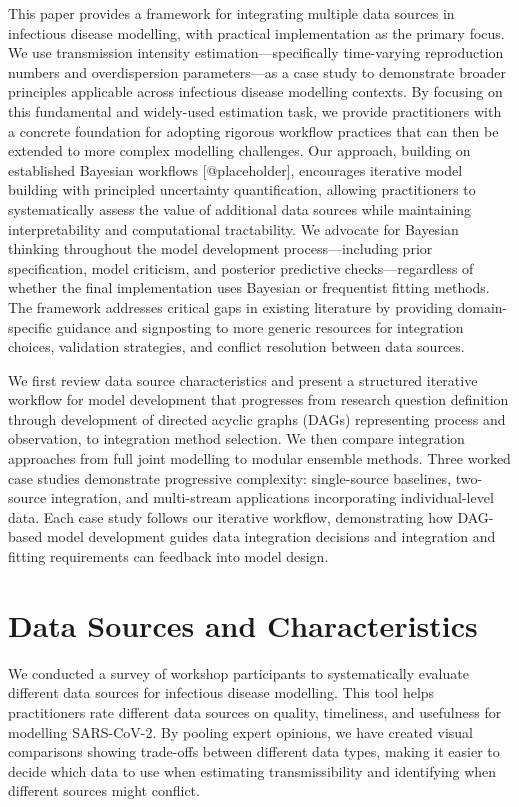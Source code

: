 \documentclass{article}
\begin{document}
This paper provides a framework for integrating multiple data sources in infectious disease modelling, with practical implementation as the primary focus.
We use transmission intensity estimation—specifically time-varying reproduction numbers and overdispersion parameters—as a case study to demonstrate broader principles applicable across infectious disease modelling contexts.
By focusing on this fundamental and widely-used estimation task, we provide practitioners with a concrete foundation for adopting rigorous workflow practices that can then be extended to more complex modelling challenges.
Our approach, building on established Bayesian workflows [@placeholder], encourages iterative model building with principled uncertainty quantification, allowing practitioners to systematically assess the value of additional data sources while maintaining interpretability and computational tractability.
We advocate for Bayesian thinking throughout the model development process—including prior specification, model criticism, and posterior predictive checks—regardless of whether the final implementation uses Bayesian or frequentist fitting methods.
The framework addresses critical gaps in existing literature by providing domain-specific guidance and signposting to more generic resources for integration choices, validation strategies, and conflict resolution between data sources.

We first review data source characteristics and present a structured iterative workflow for model development that progresses from research question definition through development of directed acyclic graphs (DAGs) representing process and observation, to integration method selection.
We then compare integration approaches from full joint modelling to modular ensemble methods.
Three worked case studies demonstrate progressive complexity: single-source baselines, two-source integration, and multi-stream applications incorporating individual-level data.
Each case study follows our iterative workflow, demonstrating how DAG-based model development guides data integration decisions and integration and fitting requirements can feedback into model design.

\section{Data Sources and Characteristics}

We conducted a survey of workshop participants to systematically evaluate different data sources for infectious disease modelling.
This tool helps practitioners rate different data sources on quality, timeliness, and usefulness for modelling SARS-CoV-2.
By pooling expert opinions, we have created visual comparisons showing trade-offs between different data types, making it easier to decide which data to use when estimating transmissibility and identifying when different sources might conflict.
\end{document}
